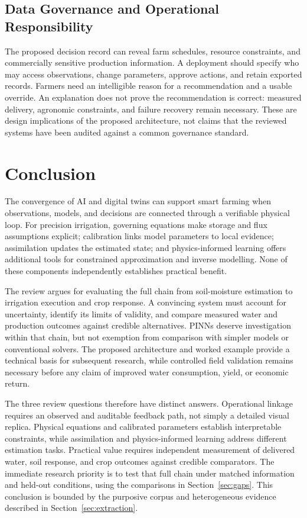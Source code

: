 \documentclass[acmsmall,screen,nonacm]{acmart}
\begin{document}
\subsection{Data Governance and Operational Responsibility}
\label{sec:governance}
The proposed decision record can reveal farm schedules, resource constraints, and commercially sensitive production information. A deployment should specify who may access observations, change parameters, approve actions, and retain exported records. Farmers need an intelligible reason for a recommendation and a usable override. An explanation does not prove the recommendation is correct: measured delivery, agronomic constraints, and failure recovery remain necessary. These are design implications of the proposed architecture, not claims that the reviewed systems have been audited against a common governance standard.

\section{Conclusion}

\label{sec:10}

The convergence of AI and digital twins can support smart farming when observations, models, and decisions are connected through a verifiable physical loop. For precision irrigation, governing equations make storage and flux assumptions explicit; calibration links model parameters to local evidence; assimilation updates the estimated state; and physics-informed learning offers additional tools for constrained approximation and inverse modelling. None of these components independently establishes practical benefit.

The review argues for evaluating the full chain from soil-moisture estimation to irrigation execution and crop response. A convincing system must account for uncertainty, identify its limits of validity, and compare measured water and production outcomes against credible alternatives. PINNs deserve investigation within that chain, but not exemption from comparison with simpler models or conventional solvers. The proposed architecture and worked example provide a technical basis for subsequent research, while controlled field validation remains necessary before any claim of improved water consumption, yield, or economic return.


The three review questions therefore have distinct answers. Operational linkage requires an observed and auditable feedback path, not simply a detailed visual replica. Physical equations and calibrated parameters establish interpretable constraints, while assimilation and physics-informed learning address different estimation tasks. Practical value requires independent measurement of delivered water, soil response, and crop outcomes against credible comparators. The immediate research priority is to test that full chain under matched information and held-out conditions, using the comparisons in Section~\ref{sec:gaps}. This conclusion is bounded by the purposive corpus and heterogeneous evidence described in Section~\ref{sec:extraction}.
\end{document}
